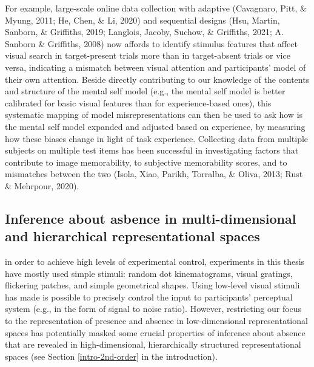 \documentclass[12pt,twoside]{reedthesis}
\begin{document}
For example, large-scale online data collection with adaptive (Cavagnaro, Pitt, \& Myung, 2011; He, Chen, \& Li, 2020) and sequential designs (Hsu, Martin, Sanborn, \& Griffiths, 2019; Langlois, Jacoby, Suchow, \& Griffiths, 2021; A. Sanborn \& Griffiths, 2008) now affords to identify stimulus features that affect visual search in target-present trials more than in target-absent trials or vice versa, indicating a mismatch between visual attention and participants' model of their own attention. Beside directly contributing to our knowledge of the contents and structure of the mental self model (e.g., the mental self model is better calibrated for basic visual features than for experience-based ones), this systematic mapping of model misrepresentations can then be used to ask how is the mental self model expanded and adjusted based on experience, by measuring how these biases change in light of task experience. Collecting data from multiple subjects on multiple test items has been successful in investigating factors that contribute to image memorability, to subjective memorability scores, and to mismatches between the two (Isola, Xiao, Parikh, Torralba, \& Oliva, 2013; Rust \& Mehrpour, 2020).

\hypertarget{inference-about-asbence-in-multi-dimensional-and-hierarchical-representational-spaces}{%
\subsection*{Inference about asbence in multi-dimensional and hierarchical representational spaces}\label{inference-about-asbence-in-multi-dimensional-and-hierarchical-representational-spaces}}

in order to achieve high levels of experimental control, experiments in this thesis have mostly used simple stimuli: random dot kinematograms, visual gratings, flickering patches, and simple geometrical shapes. Using low-level visual stimuli has made is possible to precisely control the input to participants' perceptual system (e.g., in the form of signal to noise ratio). However, restricting our focus to the representation of presence and absence in low-dimensional representational spaces has potentially masked some crucial properties of inference about absence that are revealed in high-dimensional, hierarchically structured representational spaces (see Section \ref{intro-2nd-order} in the introduction).
\end{document}
